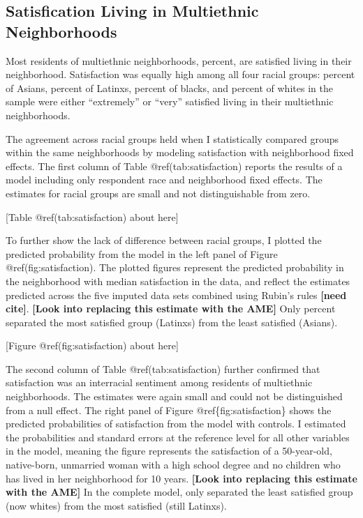 \documentclass{baderart}
\begin{document}
\subsection{Satisfication Living in Multiethnic
Neighborhoods}\label{satisfication-living-in-multiethnic-neighborhoods}

Most residents of multiethnic neighborhoods, \meansatisfied percent, are
satisfied living in their neighborhood. Satisfaction was equally high
among all four racial groups: \apisatisfied percent of Asians,
\hspsatisfied percent of Latinxs, \nhbsatisfied percent of blacks, and
\nhwsatisfied percent of whites in the sample were either ``extremely''
or ``very'' satisfied living in their multiethnic neighborhoods.

The agreement across racial groups held when I statistically compared
groups within the same neighborhoods by modeling satisfaction with
neighborhood fixed effects. The first column of Table
@ref(tab:satisfaction) reports the results of a model including only
respondent race and neighborhood fixed effects. The estimates for racial
groups are small and not distinguishable from zero.

{[}Table @ref(tab:satisfaction) about here{]}

To further show the lack of difference between racial groups, I plotted
the predicted probability from the model in the left panel of Figure
@ref(fig:satisfaction). The plotted figures represent the predicted
probability in the neighborhood with median satisfaction in the data,
and reflect the estimates predicted across the five imputed data sets
combined using Rubin's rules \textbf{{[}need cite{]}}. \textbf{{[}Look
into replacing this estimate with the AME{]}} Only \maxdiffone percent
separated the most satisfied group (Latinxs) from the least satisfied
(Asians).

{[}Figure @ref(fig:satisfaction) about here{]}

The second column of Table @ref(tab:satisfaction) further confirmed that
satisfaction was an interracial sentiment among residents of multiethnic
neighborhoods. The estimates were again small and could not be
distinguished from a null effect. The right panel of Figure
@ref\{fig:satisfaction\} shows the predicted probabilities of
satisfaction from the model with controls. I estimated the probabilities
and standard errors at the reference level for all other variables in
the model, meaning the figure represents the satisfaction of a
50-year-old, native-born, unmarried woman with a high school degree and
no children who has lived in her neighborhood for 10 years.
\textbf{{[}Look into replacing this estimate with the AME{]}} In the
complete model, only \maxdiffthree separated the least satisfied group (now
whites) from the most satisfied (still Latinxs).
\end{document}
